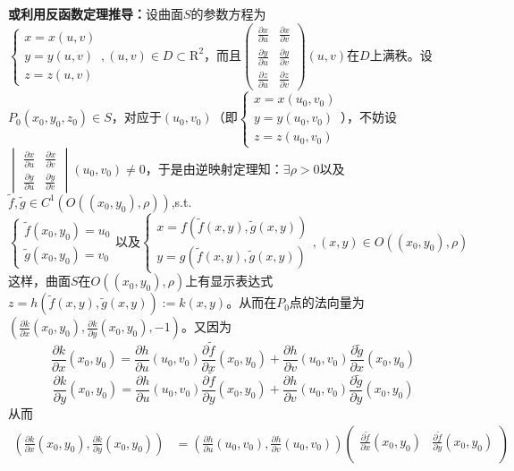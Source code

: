 \documentclass[UTF8]{ctexart}
\newcommand{\p}[2]{\frac{\partial #1}{\partial #2}}
\begin{document}
\begin{enumerate}[(1)]
        \textbf{或利用反函数定理推导：}设曲面$S$的参数方程为$\begin{cases}
            x=x(u,v)\\
            y=y(u,v)\\
            z=z(u,v)
        \end{cases},(u,v)\in D\subset\mathrm{R}^2$，而且$\begin{pmatrix}
            \p{x}{u}&\p{x}{v}\\
            \p{y}{u}&\p{y}{v}\\
            \p{z}{u}&\p{z}{v}
        \end{pmatrix}(u,v)$在$D$上满秩。设$P_0(x_0,y_0,z_0)\in S$，对应于$(u_0,v_0)$（即$\begin{cases}
            x=x(u_0,v_0)\\
            y=y(u_0,v_0)\\
            z=z(u_0,v_0)
        \end{cases}$），不妨设$\begin{vmatrix}
            \p{x}{u}&\p{x}{v}\\
            \p{y}{u}&\p{y}{v}
        \end{vmatrix}(u_0,v_0)\not=0$，于是由逆映射定理知：$\exists\rho>0$以及$\tilde{f},\tilde{g}\in C^1(O((x_0,y_0),\rho))$,s.t.
        $$\begin{cases}
            \tilde{f}(x_0,y_0)=u_0\\
            \tilde{g}(x_0,y_0)=v_0
        \end{cases}\text{以及}\begin{cases}
            x=f(\tilde{f}(x,y),\tilde{g}(x,y))\\
            y=g(\tilde{f}(x,y),\tilde{g}(x,y))
        \end{cases},(x,y)\in O((x_0,y_0),\rho)$$
        这样，曲面$S$在$O((x_0,y_0),\rho)$上有显示表达式$z=h(\tilde{f}(x,y),\tilde{g}(x,y)):=k(x,y)$。从而在$P_0$点的法向量为$\left(\p{k}{x}(x_0,y_0),\p{k}{y}(x_0,y_0),-1\right)$。又因为
        $$\p{k}{x}(x_0,y_0)=\p{h}{u}(u_0,v_0)\p{\tilde{f}}{x}(x_0,y_0)+\p{h}{v}(u_0,v_0)\p{\tilde{g}}{x}(x_0,y_0)$$
        $$\p{k}{y}(x_0,y_0)=\p{h}{u}(u_0,v_0)\p{\tilde{f}}{y}(x_0,y_0)+\p{h}{v}(u_0,v_0)\p{\tilde{g}}{y}(x_0,y_0)$$
        从而
        \begin{align*}
            \left(\p{k}{x}(x_0,y_0),\p{k}{y}(x_0,y_0)\right)&=\left(\p{h}{u}(u_0,v_0),\p{h}{v}(u_0,v_0)\right)\begin{pmatrix}
                \p{\tilde{f}}{x}(x_0,y_0)&\p{\tilde{f}}{y}(x_0,y_0)\\

\end{pmatrix}
\end{align*}
\end{enumerate}
\end{document}
